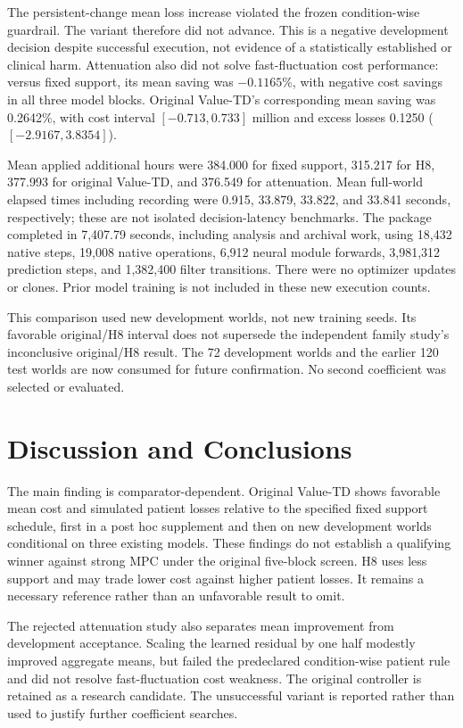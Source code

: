 \documentclass[preprint,review,12pt]{elsarticle}
\begin{document}
The persistent-change mean loss increase violated the frozen condition-wise
guardrail. The variant therefore did not advance. This is a negative
development decision despite successful execution, not evidence of a
statistically established or clinical harm. Attenuation also did not solve
fast-fluctuation cost performance: versus fixed support, its mean saving
was $-0.1165\%$, with negative cost savings in all three model blocks.
Original Value-TD's corresponding mean saving was 0.2642\%, with cost
interval $[-0.713,0.733]$ million and excess losses 0.1250
($[-2.9167,3.8354]$).

Mean applied additional hours were 384.000 for fixed support, 315.217 for
H8, 377.993 for original Value-TD, and 376.549 for attenuation. Mean full-world
elapsed times including recording were 0.915, 33.879, 33.822, and 33.841
seconds, respectively; these are not isolated decision-latency benchmarks.
The package completed in 7,407.79 seconds, including analysis and archival
work, using 18,432 native steps, 19,008 native operations, 6,912 neural
module forwards, 3,981,312 prediction steps, and 1,382,400 filter transitions.
There were no optimizer updates or clones. Prior model training is not
included in these new execution counts.

This comparison used new development worlds, not new training seeds.
Its favorable original/H8 interval does not supersede the independent
family study's inconclusive original/H8 result. The 72 development worlds
and the earlier 120 test worlds are now consumed for future confirmation.
No second coefficient was selected or evaluated.

\section{Discussion and Conclusions}
\label{sec:conclusion}
The main finding is comparator-dependent. Original Value-TD shows favorable
mean cost and simulated patient losses relative to the specified fixed
support schedule, first in a post hoc supplement and then on new
development worlds conditional on three existing models. These findings
do not establish a qualifying winner against strong MPC under the original
five-block screen. H8 uses less support and may trade lower cost against
higher patient losses. It remains a necessary reference rather than an
unfavorable result to omit.

The rejected attenuation study also separates mean improvement from
development acceptance. Scaling the learned residual by one half modestly
improved aggregate means, but failed the predeclared condition-wise patient
rule and did not resolve fast-fluctuation cost weakness. The original
controller is retained as a research candidate. The unsuccessful variant
is reported rather than used to justify further coefficient searches.
\end{document}
